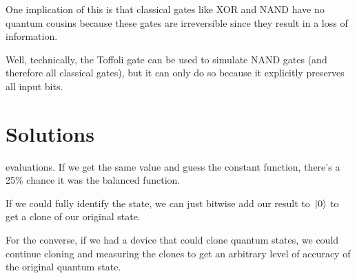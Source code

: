 One implication of this is that classical gates like \textsc{XOR} and \textsc{NAND} have no quantum cousins because these gates are irreversible since they result in a loss of information. 

Well, technically, the Toffoli gate can be used to simulate \textsc{NAND} gates (and therefore all classical gates), but it can only do so because it explicitly preserves all input bits. 

\section{Solutions}

 evaluations. If we get the same value and guess the constant function, there's a 25\% chance it was the balanced function. 

\exercise 
If we could fully identify the state, we can just bitwise add our result to $\ket*{0}$ to get a clone of our original state. 

For the converse, if we had a device that could clone quantum states, we could continue cloning and measuring the clones to get an arbitrary level of accuracy of the original quantum state. 
